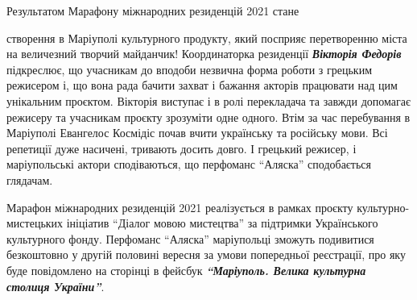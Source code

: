
Результатом Марафону міжнародних резиденцій 2021 стане\par\noindent створення в Маріуполі
культурного продукту, який посприяє перетворенню міста на величезний творчий
майданчик! Координаторка резиденції \emph{\textbf{Вікторія Федорів}} підкреслює, що учасникам
до вподоби незвична форма роботи з грецьким режисером і, що вона рада бачити
захват і бажання  акторів працювати над цим унікальним проєктом. Вікторія
виступає і в ролі перекладача та завжди допомагає режисеру та учасникам проєкту
зрозуміти одне одного. Втім за час перебування в Маріуполі Евангелос Космідіс
почав вчити українську та російську мови.  Всі репетиції дуже насичені,
тривають досить довго. І грецький режисер, і маріупольські актори сподіваються,
що перфоманс  \enquote{Аляска} сподобається глядачам.

Марафон міжнародних резиденцій 2021 реалізується в рамках проєкту
культурно-мистецьких ініціатив \enquote{Діалог мовою мистецтва} за підтримки
Українського культурного фонду. Перфоманс \enquote{Аляска} маріупольці зможуть
подивитися безкоштовно у другій половині вересня за умови попередньої
реєстрації, про яку буде повідомлено на сторінці в фейсбук \emph{\textbf{\enquote{Маріуполь. Велика
культурна столиця України}}}.
